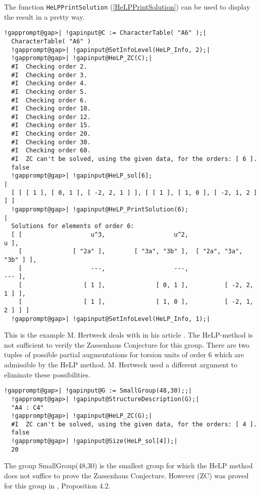 \documentclass[a4paper,11pt]{report}
\begin{document}
{{ The function \texttt{HeLP{\textunderscore}PrintSolution} (\ref{HeLPPrintSolution}) can be used to display the result in a pretty way. 
\begin{Verbatim}[commandchars=!@|,fontsize=\small,frame=single,label=Example]
  !gapprompt@gap>| !gapinput@C := CharacterTable( "A6" );|
  CharacterTable( "A6" )
  !gapprompt@gap>| !gapinput@SetInfoLevel(HeLP_Info, 2);|
  !gapprompt@gap>| !gapinput@HeLP_ZC(C);|
  #I  Checking order 2.
  #I  Checking order 3.
  #I  Checking order 4.
  #I  Checking order 5.
  #I  Checking order 6.
  #I  Checking order 10.
  #I  Checking order 12.
  #I  Checking order 15.
  #I  Checking order 20.
  #I  Checking order 30.
  #I  Checking order 60.
  #I  ZC can't be solved, using the given data, for the orders: [ 6 ].
  false
  !gapprompt@gap>| !gapinput@HeLP_sol[6];                                          |
  [ [ [ 1 ], [ 0, 1 ], [ -2, 2, 1 ] ], [ [ 1 ], [ 1, 0 ], [ -2, 1, 2 ] ] ]
  !gapprompt@gap>| !gapinput@HeLP_PrintSolution(6);                                |
  Solutions for elements of order 6:
  [ [                   u^3,                   u^2,                     u ],
    [              [ "2a" ],        [ "3a", "3b" ],  [ "2a", "3a", "3b" ] ],
    [                   ---,                   ---,                   --- ],
    [                 [ 1 ],              [ 0, 1 ],          [ -2, 2, 1 ] ],
    [                 [ 1 ],              [ 1, 0 ],          [ -2, 1, 2 ] ] ]
  !gapprompt@gap>| !gapinput@SetInfoLevel(HeLP_Info, 1);|
\end{Verbatim}
 This is the example M. Hertweck deals with in his article \cite{HerA6}. The HeLP-method is not sufficient to verify the Zassenhaus Conjecture for
this group. There are two tuples of possible partial augmentations for torsion
units of order 6 which are admissible by the HeLP method. M. Hertweck used a
different argument to eliminate these possibilities. 
\begin{Verbatim}[commandchars=!@|,fontsize=\small,frame=single,label=Example]
  !gapprompt@gap>| !gapinput@G := SmallGroup(48,30);;|
  !gapprompt@gap>| !gapinput@StructureDescription(G);|
  "A4 : C4"
  !gapprompt@gap>| !gapinput@HeLP_ZC(G);|
  #I  ZC can't be solved, using the given data, for the orders: [ 4 ].
  false
  !gapprompt@gap>| !gapinput@Size(HeLP_sol[4]);|
  20
\end{Verbatim}
 The group SmallGroup(48,30) is the smallest group for which the HeLP method
does not suffice to prove the Zassenhaus Conjecture. However (ZC) was proved
for this group in \cite{HoefertKimmerle}, Proposition 4.2. 
}}
\end{document}
